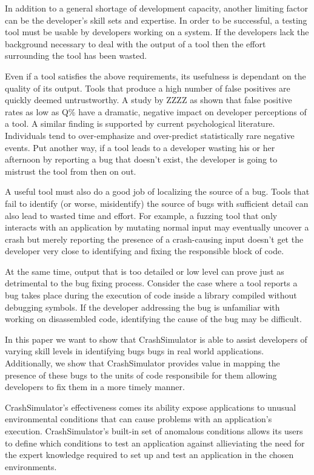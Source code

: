In addition to a general shortage of development capacity, another limiting
factor can be the developer's skill sets and expertise.  In order to be
successful, a testing tool must be usable by developers working on a
system.  If the developers lack the background necessary to deal with the
output of a tool then the effort surrounding the tool has been wasted.

Even if a tool satisfies the above requirements, its usefulness is
dependant on the quality of its output.  Tools that produce a high number
of false positives are quickly deemed untrustworthy.  A study by ZZZZ as
shown that false positive rates as low as Q\% have a dramatic, negative
impact on developer perceptions of a tool.    A similar
finding is supported by current psychological literature.  Individuals tend
to over-emphasize and over-predict statistically rare negative
events.  Put another way, if a tool leads to a developer
wasting his or her afternoon by reporting a bug that doesn't exist, the
developer is going to mistrust the tool from then on out.

A useful tool must also do a good job of localizing the source of a bug.
Tools that fail to identify (or worse, misidentify) the source of bugs with
sufficient detail can also lead to wasted time and effort.  For example, a
fuzzing tool that only interacts with an application by mutating normal
input may eventually uncover a crash but merely reporting the presence of a
crash-causing input doesn't get the developer very close to identifying and
fixing the responsible block of code.

At the same time, output that is too detailed or low level can prove just
as detrimental to the bug fixing process.  Consider the case where a tool
reports a bug takes place during the execution of code inside a library
compiled without debugging symbols.  If the developer addressing the bug is
unfamiliar with working on disassembled code, identifying the cause of the
bug may be difficult.

In this paper we want to show that CrashSimulator is able to assist
developers of varying skill levels in identifying bugs bugs in real world
applications.  Additionally, we show that CrashSimulator provides value in
mapping the presence of these bugs to the units of code responsibile for
them allowing developers to fix them in a more timely manner.

CrashSimulator's effectiveness comes its ability expose applications to
unusual environmental conditions that can cause problems with an
application's execution.  CrashSimulator's built-in set of anomalous
conditions allows its users to define which conditions to test an
application against allieviating the need for the expert knowledge required
to set up and test an application in the chosen environments.


